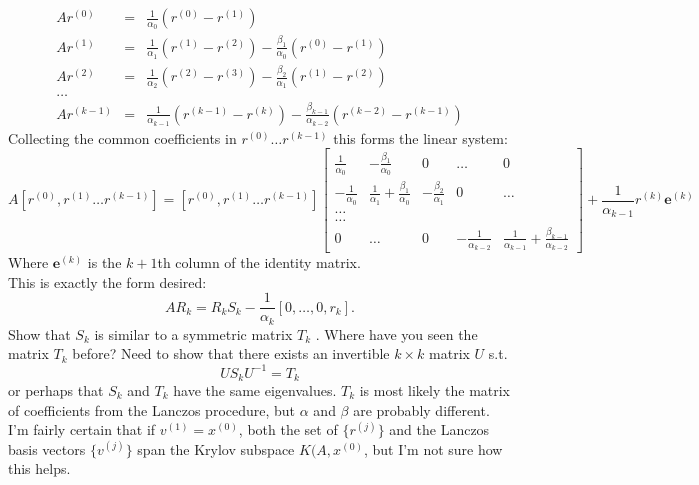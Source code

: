 \documentclass{article}
\newcommand{\ea}[1]{\begin{eqnarray*}#1\end{eqnarray*}}
\newcommand{\mat}[2]{\left[\begin{array}{#1}#2\end{array}\right]}
\newcommand{\inv}[1]{#1^{-1}}
\begin{document}
\ea{
	A r^{(0)} &=& \frac{1}{\alpha_0}(r^{(0)} - r^{(1)}) \\
	A r^{(1)} &=&  \frac{1}{\alpha_1}(r^{(1)} - r^{(2)}) - \frac{\beta_1}{\alpha_{0}}  \left( r^{(0)} - r^{(1)} \right) \\
	A r^{(2)} &=&  \frac{1}{\alpha_2}(r^{(2)} - r^{(3)}) - \frac{\beta_2}{\alpha_{1}}  \left( r^{(1)} - r^{(2)} \right) \\
	\dots\\
	A r^{(k-1)} &=&  \frac{1}{\alpha_{k-1}}(r^{(k-1)} - r^{(k)}) - \frac{\beta_{k-1}}{\alpha_{k-2}}  \left( r^{(k-2)} - r^{(k-1)} \right)
}
Collecting the common coefficients in $r^{(0)}\dots r^{(k-1)}$ this forms the linear system:
\[ A [r^{(0)}, r^{(1)} \dots r^{(k-1)}] = [r^{(0)}, r^{(1)} \dots r^{(k-1)}] 
	\mat{ccccc}{ \frac{1}{\alpha_0} & - \frac{\beta_1}{\alpha_{0}} & 0 & \dots & 0 \\
	-\frac{1}{\alpha_0} & \frac{1}{\alpha_1} + \frac{\beta_1}{\alpha_0} &  - \frac{\beta_2}{\alpha_{1}} & 0 & \dots  \\
	\dots \\
	\dots \\
	0 & \dots & 0 & -\frac{1}{\alpha_{k-2}} & \frac{1}{\alpha_{k-1}} + \frac{\beta_{k-1}}{\alpha_{k-2}} 
	} + \frac{1}{\alpha_{k-1}}r^{(k)}\mathbf{e}^{(k)}
\]
Where $\mathbf{e}^{(k)}$ is the $k+1$th column of the identity matrix.  \\
This is exactly the form desired:
\[              AR_k = R_k S_k - \frac{1}{\alpha_k}[0, \dots , 0, r_k ].   \]
 Show that $S_k$ is similar to a symmetric matrix $T_k$ . Where 
have you seen the matrix $T_k$ before?
Need to show that there exists an invertible $k\times k$ matrix $U$ s.t.
\[ US_k\inv{U} = T_k \]
or perhaps that $S_k$ and $T_k$ have the same eigenvalues.  $T_k$ is most likely
the matrix of coefficients from the Lanczos procedure, but $\alpha$ and $\beta$
are probably different.  I'm fairly certain that if $v^{(1)}=x^{(0)}$, both the set 
of $\{r^{(j)}\}$ and the Lanczos basis vectors $\{v^{(j)}\}$ span the Krylov 
subspace $K(A,x^{(0)}$, but I'm not sure how this helps.  
\end{document}
